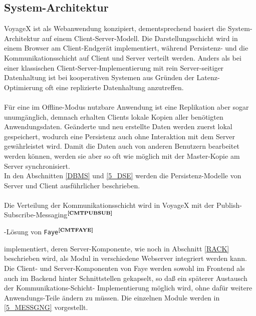 \subsection{System-Architektur}\label{5_SA}
VoyageX ist als Webanwendung konzipiert, dementsprechend basiert die System- Architektur auf einem Client-Server-Modell. Die Darstellungsschicht wird in einem Browser am Client-Endgerät implementiert, während Persistenz- und die Kommunikationsschicht auf Client und Server verteilt werden. Anders als bei einer klassischen Client-Server-Implementierung mit rein Server-seitiger Datenhaltung ist bei kooperativen Systemen aus Gründen der Latenz-Optimierung oft eine replizierte Datenhaltung anzutreffen.\\ \\
Für eine im Offline-Modus nutzbare Anwendung ist eine Replikation aber sogar unumgänglich, demnach erhalten Clients lokale Kopien aller benötigten Anwendungsdaten. Geänderte und neu erstellte Daten werden zuerst lokal gespeichert, wodurch eine
Persistenz auch ohne Interaktion mit dem Server gewährleistet wird. Damit die Daten auch von anderen Benutzern bearbeitet werden können, werden sie aber so oft wie möglich mit der Master-Kopie am Server synchronisiert.\\
In den Abschnitten \ref{DBMS} und \ref{5_DSE} werden die Persistenz-Modelle von Server und Client ausführlicher beschrieben.\\ \\%
Die Verteilung der Kommunikationsschicht wird in VoyageX mit der Publish-Subscribe-Messaging$^{\textbf{\ref{CMTPUBSUB}}}$%
\addtocounter{footnote}{1}%
-Lösung von \texttt{Faye}$^{\textbf{\ref{CMTFAYE}}}$%
\addtocounter{footnote}{1}%
implementiert, deren Server-Komponente, wie noch in Abschnitt \ref{RACK} beschrieben wird, als Modul in verschiedene Webserver integriert werden kann. Die Client- und Server-Komponenten von Faye werden sowohl im Frontend als auch im Backend hinter Schnittstellen gekapselt, so daß ein späterer Austausch der Kommunikations-Schicht- Implementierung möglich wird, ohne dafür weitere Anwendungs-Teile ändern zu müssen. Die einzelnen Module werden in \ref{5_MESSGNG} vorgestellt.\\ \\
